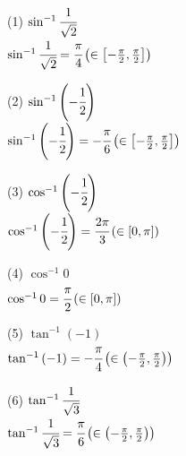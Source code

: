 \documentclass[fleqn]{jsarticle}
\begin{document}
    \begin{description}
        \setlength{\itemsep}{0.5cm}

        \begin{multicols}{2}

            \item[(1)]
                $ \sin^{-1}{\cfrac{1}{\sqrt{2}}} $ \\
                $ \sin^{-1}{\cfrac{1}{\sqrt{2}}} = \cfrac{\pi}{4}\left(\in\left[-\frac{\pi}{2}, \frac{\pi}{2}\right]\right) $

            \item[(2)]
                $ \sin^{-1}{\left(-\cfrac{1}{2}\right)} $ \\
                $ \sin^{-1}{\left(-\cfrac{1}{2}\right)} = -\cfrac{\pi}{6}\left(\in\left[-\frac{\pi}{2}, \frac{\pi}{2}\right]\right) $

        \end{multicols}

        \begin{multicols}{2}

            \item[(3)]
                $ \cos^{-1}{\left(-\cfrac{1}{2}\right)} $ \\
                $ \cos^{-1}{\left(-\cfrac{1}{2}\right)} = \cfrac{2\pi}{3}\left(\in\left[0, \pi\right]\right) $

            \item[(4)]
                $ \cos^{-1}{0} $ \\
                $ \cos^{-1}{0} = \cfrac{\pi}{2}\left(\in\left[0, \pi\right]\right) $

        \end{multicols}

        \begin{multicols}{2}

            \item[(5)]
                $ \tan^{-1}{(-1)} $ \\
                $ \tan^{-1}{(-1)} = -\cfrac{\pi}{4}\left(\in\left(-\frac{\pi}{2}, \frac{\pi}{2}\right)\right) $

            \item[(6)]
                $ \tan^{-1}{\cfrac{1}{\sqrt{3}}} $ \\
                $ \tan^{-1}{\cfrac{1}{\sqrt{3}}} = \cfrac{\pi}{6}\left(\in\left(-\frac{\pi}{2}, \frac{\pi}{2}\right)\right) $

        \end{multicols}

    \end{description}
\end{document}
